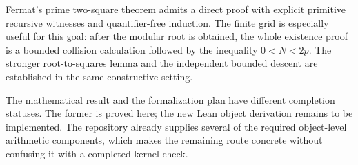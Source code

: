 \documentclass[11pt,letterpaper]{article}
\theoremstyle{definition}
\theoremstyle{remark}
\begin{document}
Fermat's prime two-square theorem admits a direct proof with explicit
primitive recursive witnesses and quantifier-free induction.
The finite grid is especially useful for this goal: after the modular
root is obtained, the whole existence proof is a bounded collision
calculation followed by the inequality \(0<N<2p\).
The stronger root-to-squares lemma and the independent bounded descent
are established in the same constructive setting.

The mathematical result and the formalization plan have different
completion statuses. The former is proved here; the new Lean object
derivation remains to be implemented. The repository already supplies
several of the required object-level arithmetic components, which makes
the remaining route concrete without confusing it with a completed
kernel check.
\end{document}
